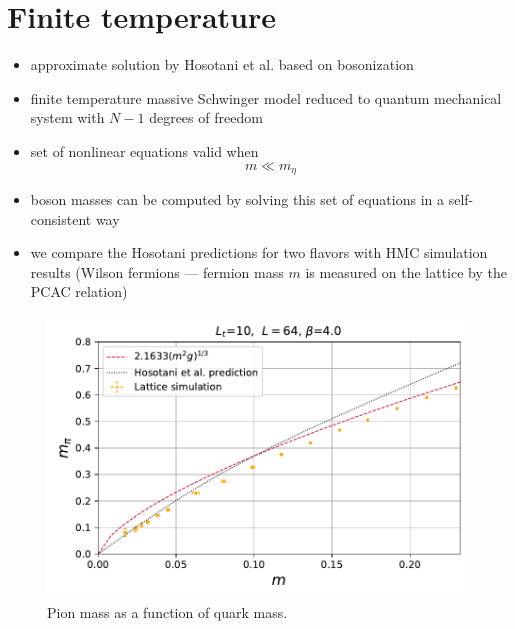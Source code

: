 \documentclass[a4paper,11pt]{article}
\begin{document}
  
\section{Finite temperature}

  \begin{itemize}
    \item approximate solution by Hosotani et al.\cite{Hetrick1996}
      based on bosonization
    \item finite temperature massive Schwinger model reduced to
      quantum mechanical system with $N - 1$ degrees of freedom
    \item set of nonlinear equations valid when
      \[
        m \ll m_\eta
      \]
    \item boson masses can be computed by solving this set of 
      equations in a self-consistent way
    \item we compare the Hosotani predictions for two flavors
      with HMC simulation results (Wilson fermions --- fermion mass
      $m$ is measured on the lattice by the PCAC relation)
  \end{itemize}

\begin{figure}
  \includegraphics[width=1\textwidth]{figs/MPi64x10vsMFiniteT_Pt2}
  \caption{Pion mass as a function of quark mass.}
\end{figure}
\end{document}

